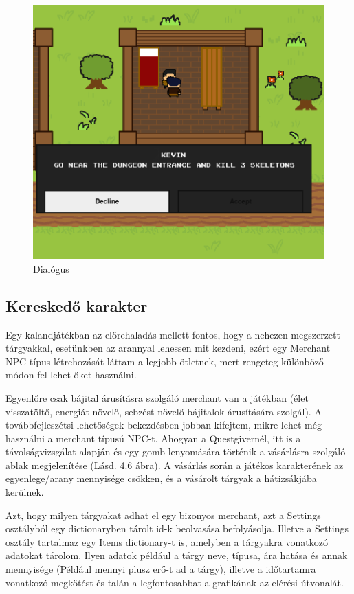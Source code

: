 \begin{figure}[H]
    \centering
    \includegraphics[width=14.0truecm]{images/dialogue.png}
    \caption{Dialógus \cite{dialogue}}
    \label{fig:Dialógus rendszer}
\end{figure}

\subsection{Kereskedő karakter}

\indent \indent Egy kalandjátékban az előrehaladás mellett fontos, hogy a nehezen megszerzett tárgyakkal, esetünkben az arannyal lehessen mit kezdeni, ezért egy Merchant NPC típus létrehozását láttam a legjobb ötletnek, mert rengeteg különböző módon fel lehet őket használni. 

Egyenlőre csak bájital árusításra szolgáló merchant van a játékban (élet visszatöltő, energiát növelő, sebzést növelő bájitalok árusítására szolgál). A továbbfejleszétsi lehetőségek bekezdésben jobban kifejtem, mikre lehet még használni a merchant típusú NPC-t.  Ahogyan a Questgivernél, itt is a távolságvizsgálat alapján és egy gomb lenyomására történik a vásárlásra szolgáló ablak megjelenítése (Lásd. 4.6 ábra). A vásárlás során a játékos karakterének az egyenlege/arany mennyisége csökken, és a vásárolt tárgyak a hátizsákjába kerülnek.

Azt, hogy milyen tárgyakat adhat el egy bizonyos merchant, azt a Settings osztályból egy dictionaryben tárolt id-k beolvasása befolyásolja. Illetve a Settings osztály tartalmaz egy Items dictionary-t is, amelyben a tárgyakra vonatkozó adatokat tárolom. Ilyen adatok például a tárgy neve, típusa, ára hatása és annak mennyisége (Például mennyi plusz erő-t ad a tárgy), illetve a időtartamra vonatkozó megkötést és talán a legfontosabbat a grafikának az elérési útvonalát.  


